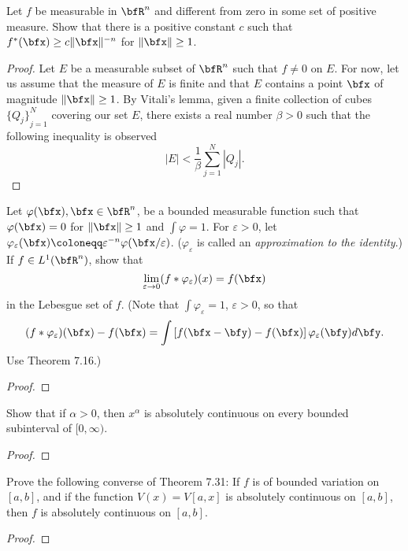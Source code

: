 
\begin{problem}
Let $f$ be measurable in $\bfR^n$ and different from zero in some set of
positive measure. Show that there is a positive constant $c$ such that
$f^*(\bfx)\geq c\|\bfx\|^{-n}$ for $\|\bfx\|\geq 1$.
\end{problem}
\begin{proof}
Let $E$ be a measurable subset of $\bfR^n$ such that $f\neq 0$ on $E$. For
now, let us assume that the measure of $E$ is finite and that $E$ contains
a point $\bfx$ of magnitude $\|\bfx\|\geq 1$. By Vitali's lemma, given a
finite collection of cubes ${\{Q_j\}}_{j=1}^N$ covering our set $E$, there
exists a real number $\beta>0$ such that the following inequality is
observed
\begin{equation}
\label{eq:10:vitalis-covering-lemma}
|E|<\frac{1}{\beta}\sum_{j=1}^N|Q_j|.
\end{equation}
\end{proof}
\newpage

\begin{problem}
Let $\varphi(\bfx),\bfx\in\bfR^n$, be a bounded measurable function such
that $\varphi(\bfx)=0$ for $\|\bfx\|\geq 1$ and $\int\varphi=1$. For
$\varepsilon>0$, let
$\varphi_\varepsilon(\bfx)\coloneqq\varepsilon^{-n}\varphi(\bfx/\varepsilon)$. ($\varphi_\varepsilon$
is called an \emph{approximation to the identity}.) If $f\in L^1(\bfR^n)$,
show that
\[
\lim_{\varepsilon\to 0}(f*\varphi_\varepsilon)(x)=f(\bfx)
\]
in the Lebesgue set of $f$. (Note that $\int\varphi_\varepsilon=1$,
$\varepsilon>0$, so that
\[
(f*\varphi_\varepsilon)(\bfx)-f(\bfx)=\int\left[f(\bfx-\bfy)-f(\bfx)\right]\varphi_\varepsilon(\bfy)d\bfy.
\]
Use Theorem 7.16.)
\end{problem}
\begin{proof}
\end{proof}
\newpage

\begin{problem}
Show that if $\alpha>0$, then $x^\alpha$ is absolutely continuous on every
bounded subinterval of $[0,\infty)$.
\end{problem}
\begin{proof}
\end{proof}
\newpage


\begin{problem}
Prove the following converse of Theorem 7.31: If $f$ is of bounded
variation on $[a,b]$, and if the function $V(x)=V[a,x]$ is absolutely
continuous on $[a,b]$, then $f$ is absolutely continuous on $[a,b]$.
\end{problem}
\begin{proof}
\end{proof}
\newpage

